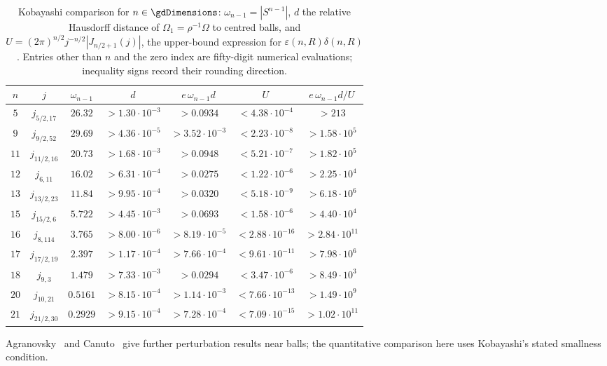 \begin{table}[ht]
\centering\footnotesize
\begin{tabular}{@{}cccccc c@{}}
\toprule
$n$ & $j$ & $\omega_{n-1}$ & $d$ & $e\,\omega_{n-1}d$ & $U$ & $e\,\omega_{n-1}d/U$\\
\midrule
$5$ & $j_{5/2,17}$ & $26.32$ & $>1.30\cdot10^{-3}$ & $>0.0934$ & $<4.38\cdot10^{-4}$ & $>213$ \\
$9$ & $j_{9/2,52}$ & $29.69$ & $>4.36\cdot10^{-5}$ & $>3.52\cdot10^{-3}$ & $<2.23\cdot10^{-8}$ & $>1.58\cdot10^{5}$ \\
$11$ & $j_{11/2,16}$ & $20.73$ & $>1.68\cdot10^{-3}$ & $>0.0948$ & $<5.21\cdot10^{-7}$ & $>1.82\cdot10^{5}$ \\
$12$ & $j_{6,11}$ & $16.02$ & $>6.31\cdot10^{-4}$ & $>0.0275$ & $<1.22\cdot10^{-6}$ & $>2.25\cdot10^{4}$ \\
$13$ & $j_{13/2,23}$ & $11.84$ & $>9.95\cdot10^{-4}$ & $>0.0320$ & $<5.18\cdot10^{-9}$ & $>6.18\cdot10^{6}$ \\
$15$ & $j_{15/2,6}$ & $5.722$ & $>4.45\cdot10^{-3}$ & $>0.0693$ & $<1.58\cdot10^{-6}$ & $>4.40\cdot10^{4}$ \\
$16$ & $j_{8,114}$ & $3.765$ & $>8.00\cdot10^{-6}$ & $>8.19\cdot10^{-5}$ & $<2.88\cdot10^{-16}$ & $>2.84\cdot10^{11}$ \\
$17$ & $j_{17/2,19}$ & $2.397$ & $>1.17\cdot10^{-4}$ & $>7.66\cdot10^{-4}$ & $<9.61\cdot10^{-11}$ & $>7.98\cdot10^{6}$ \\
$18$ & $j_{9,3}$ & $1.479$ & $>7.33\cdot10^{-3}$ & $>0.0294$ & $<3.47\cdot10^{-6}$ & $>8.49\cdot10^{3}$ \\
$20$ & $j_{10,21}$ & $0.5161$ & $>8.15\cdot10^{-4}$ & $>1.14\cdot10^{-3}$ & $<7.66\cdot10^{-13}$ & $>1.49\cdot10^{9}$ \\
$21$ & $j_{21/2,30}$ & $0.2929$ & $>9.15\cdot10^{-4}$ & $>7.28\cdot10^{-4}$ & $<7.09\cdot10^{-15}$ & $>1.02\cdot10^{11}$ \\
\bottomrule
\end{tabular}
\caption{Kobayashi comparison for $n\in\gdRigDimensions$: $\omega_{n-1}=|S^{n-1}|$, $d$ the relative Hausdorff distance of $\Omega_1=\rho^{-1}\Omega$ to centred balls, and $U=(2\pi)^{n/2}j^{-n/2}|J_{n/2+1}(j)|$, the upper-bound expression for $\varepsilon(n,R)\delta(n,R)$. Entries other than $n$ and the zero index are fifty-digit numerical evaluations; inequality signs record their rounding direction.}\label{tab:rig-kob}
\end{table}


Agranovsky~\cite{Agr93} and Canuto~\cite{Can14} give further perturbation results near balls; the quantitative comparison here uses Kobayashi's stated smallness condition.

